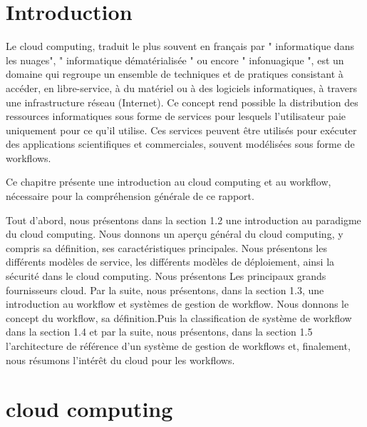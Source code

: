  	 \section{Introduction}
 	  
    
    Le cloud computing, traduit le plus souvent en français par " informatique dans les nuages", " informatique dématérialisée " ou encore " infonuagique ", est un domaine qui regroupe un ensemble de techniques et de pratiques consistant à accéder, en libre-service, à du matériel ou à des logiciels informatiques, à travers une infrastructure réseau (Internet). Ce concept rend possible la distribution des ressources informatiques sous forme de services pour lesquels l'utilisateur paie uniquement pour ce qu'il utilise. Ces services peuvent être utilisés pour exécuter des applications scientifiques et commerciales, souvent modélisées sous forme de workflows.
     
    Ce chapitre présente une introduction au cloud computing et au workflow, nécessaire pour la compréhension générale de ce rapport.
    
    Tout d’abord, nous présentons dans la section 1.2 une introduction au paradigme du cloud computing. Nous donnons un aperçu général du cloud computing, y compris sa définition, ses caractéristiques principales. Nous présentons les différents modèles de service, les différents modèles de déploiement, ainsi la sécurité dans le  cloud computing. Nous présentons Les principaux grands fournisseurs cloud. Par la suite, nous présentons, dans la section 1.3, une introduction au workflow et systèmes de gestion de workflow. Nous donnons le concept du workflow, sa définition.Puis la classification de système de workflow  dans la section 1.4   et  par la suite, nous présentons, dans la section 1.5 l’architecture de référence d’un système de gestion de workflows et, finalement, nous résumons l'intérêt du cloud pour les workflows.
    
    \section{cloud computing}

